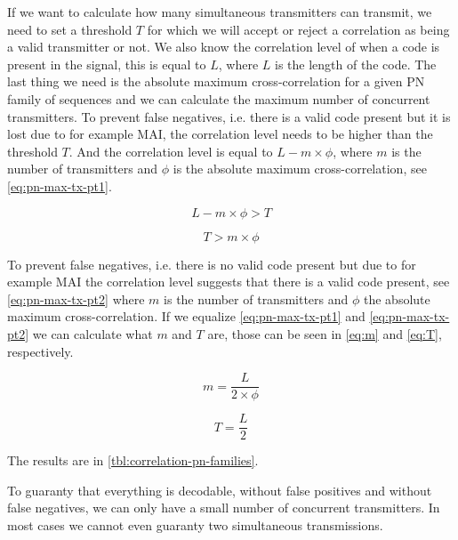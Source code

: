 		If we want to calculate how many simultaneous transmitters can transmit, we need to set a threshold $T$ for which we will accept or reject a correlation as being a valid transmitter or not.
		We also know the correlation level of when a code is present in the signal, this is equal to $L$, where $L$ is the length of the code.
		The last thing we need is the absolute maximum cross-correlation for a given PN family of sequences and we can calculate the maximum number of concurrent transmitters.
		To prevent false negatives, i.e. there is a valid code present but it is lost due to for example MAI, the correlation level needs to be higher than the threshold $T$. 
		And the correlation level is equal to $L - m \times \phi$, where $m$ is the number of transmitters and $\phi$ is the absolute maximum cross-correlation, see \autoref{eq:pn-max-tx-pt1}.

		\begin{equation}
			\label{eq:pn-max-tx-pt1}
			L - m \times \phi > T
		\end{equation}

		\begin{equation}
			\label{eq:pn-max-tx-pt2}
			T > m \times \phi
		\end{equation}

		To prevent false negatives, i.e. there is no valid code present but due to for example MAI the correlation level suggests that there is a valid code present, see \autoref{eq:pn-max-tx-pt2} where $m$ is the number of transmitters and $\phi$ the absolute maximum cross-correlation.
		If we equalize \autoref{eq:pn-max-tx-pt1} and \autoref{eq:pn-max-tx-pt2} we can calculate what $m$ and $T$ are, those can be seen in \autoref{eq:m} and \autoref{eq:T}, respectively.

		\begin{equation}
			\label{eq:m}
			m = \frac{L}{2 \times \phi}
		\end{equation}

		\begin{equation}
			\label{eq:T}
			T = \frac{L}{2}
		\end{equation}

		The results are in \autoref{tbl:correlation-pn-families}.
		
		To guaranty that everything is decodable, without false positives and without false negatives, we can only have a small number of concurrent transmitters.
		In most cases we cannot even guaranty two simultaneous transmissions.







